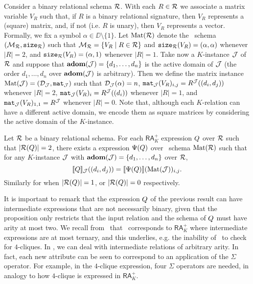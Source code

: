 Consider a binary relational schema $\mathcal{R}$. With each $R\in \mathcal{R}$ we associate a matrix variable $V_R$ such that, if $R$ is a binary relational signature, then $V_R$ represents a (square) matrix, and, if not (i.e. $R$ is unary), then $V_R$ represents a vector. Formally, we fix a symbol $\alpha \in \DD \setminus \{1\}$. Let $\text{Mat}(\mathcal{R})$ denote the \lang \ schema
$(\mathcal{M}_{\mathcal{R}},\texttt{size}_{\mathcal{R}})$ such that $\mathcal{M}_{\mathcal{R}} = \{ V_R \mid R \in \mathcal{R}\}$ and $\texttt{size}_{\mathcal{R}}(V_R) = (\alpha, \alpha)$ whenever $|R| = 2$, and $\texttt{size}_{\mathcal{R}}(V_R) = (\alpha, 1)$ whenever $|R|=1$. 
Take now a $K$-instance $\mathcal{J}$ of $\mathcal{R}$ and suppose that $\mathbf{adom}(\mathcal{J}) = \{d_1, \ldots, d_n\}$ is the active domain of $\mathcal{J}$ (the order $d_1, \ldots, d_n$ over $\mathbf{adom}(\mathcal{J})$ is arbitrary). Then we define the matrix instance $\text{Mat}(\mathcal{J}) = (\mathcal{D}_{\mathcal{J}},\texttt{mat}_{\mathcal{J}})$ such that $\mathcal{D}_{\mathcal{J}}(\alpha) = n$, $\texttt{mat}_{\mathcal{J}}(V_R)_{i,j} = R^{\mathcal{J}}((d_i, d_j))$ whenever $|R|=2$,  $\texttt{mat}_{\mathcal{J}}(V_R)_{i} = R^{\mathcal{J}}((d_i))$ whenever $|R|=1$, and $\texttt{mat}_{\mathcal{J}}(V_R)_{1,1} = R^{\mathcal{J}}$ whenever $|R|=0$. 
Note that, although each $K$-relation can have a different active domain, we encode them as square matrices by considering the active domain of the $K$-instance. %
\begin{proposition}\label{prop:ara_to_sum} 
	Let $\mathcal{R}$ be a binary relational schema. For each $\mathsf{RA}_{K}^+$  expression $Q$ over $\mathcal{R}$  such that $|\mathcal{R}(Q)| = 2$, there exists a \langsum  expression $\Psi(Q)$ over \lang \ schema $\text{Mat}(\mathcal{R})$ such that for any $K$-instance $\mathcal{J}$ with $\mathbf{adom}(\mathcal{J}) = \{d_1, \ldots, d_n\}$ over $\mathcal{R}$,
	$$
	\llbracket Q \rrbracket_{\mathcal{J}}((d_i, d_j))=\llbracket \Psi(Q) \rrbracket(\text{Mat}(\mathcal{J}))_{i,j}.
	$$
	Similarly for when $|\mathcal{R}(Q)| = 1$, or $|\mathcal{R}(Q)| = 0$ respectively.
\end{proposition}



It is important to remark that the expression $Q$ of the previous result can have intermediate expressions that are not necessarily binary, given that the proposition only restricts that the input relation and the schema of $Q$ must have arity at most two. We recall from~\cite{brijder2019matrices} that \lang\ corresponds to $\mathsf{RA}_{K}^+$ where intermediate expressions are at most ternary, and this underlies, e.g. the inability of \lang\ to check for $4$-cliques. In \langsum, we can deal with intermediate relations of arbitrary arity. In fact, each new attribute can be seen to correspond to an application of the $\Sigma$ operator. For example, in the $4$-clique expression, four $\Sigma$ operators are needed, in analogy to how
$4$-clique is expressed in $\mathsf{RA}_{K}^+$.

